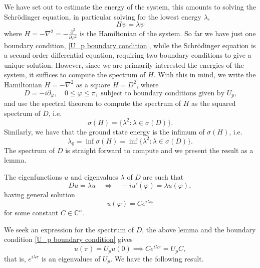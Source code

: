 We have set out to estimate the energy of the system, this amounts to solving the Schrödinger equation, in particular solving for the lowest energy $λ$,
\begin{equation}
  H \psi = λ \psi
\end{equation}
where $H = -\nabla^2 = -\frac{\partial^2}{\partial\varphi^2}$ is the Hamiltonian of the system.
So far we have just one boundary condition, \cref{U_p boundary condition}, while the Schrödinger equation is a second order differential equation, requiring two boundary conditions to give a unique solution.
However, since we are primarily interested the energies of the system, it suffices to compute the spectrum of $H$. With this in mind, we write the Hamiltonian $H = -\nabla^2$ as a square $H = D^2$, where
\begin{equation}
  D = -i\partial_\varphi, \quad 0 \le \varphi \le π, \text{ subject to boundary conditions given by $U_p$,}
\end{equation}
and use the spectral theorem to compute the spectrum of $H$ as the squared spectrum of $D$, i.e.
\begin{equation}
  σ(H) = \{λ^2 : λ \in σ(D)\}.
\end{equation}
Similarly, we have that the ground state energy is the infimum of $σ(H)$, i.e.
\begin{equation}
  λ_0 = \inf σ(H) = \inf \{λ^2 : λ \in σ(D)\}.
\end{equation}
The spectrum of $D$ is straight forward to compute and we present the result as a lemma.

\begin{lemma}
  The eigenfunctions $u$ and eigenvalues $λ$ of $D$ are such that
  \begin{equation}
    D u = λ u \quad \iff \quad -iu'(\varphi) = λ u(\varphi),
  \end{equation}
  having general solution
  \begin{equation}
    u(\varphi) = C e^{iλ\varphi}
  \end{equation}
  for some constant $C \in \mathbb{C}^n$.
\end{lemma}

We seek an expression for the spectrum of $D$, the above lemma and the boundary condition \cref{U_p boundary condition} gives
\begin{equation}
  u(π) = U_p u(0) \implies
  C e^{iλπ} = U_p C,
\end{equation}
that is, $e^{iλπ}$ is an eigenvalues of $U_p$. We have the following result.

